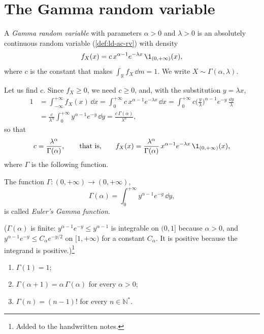 
\section{The Gamma random variable}\label{sec:tr-gamma}

\begin{definition}\label{def:tr-gamma}
A \emph{Gamma random variable} with parameters $\alpha>0$ and $\lambda>0$ is an absolutely
continuous random variable (\cref{def:ld-ac-rv}) with density
\[
  f_X(x)=c\,x^{\alpha-1}e^{-\lambda x}\,\1_{(0,+\infty)}(x),
\]
where $c$ is the constant that makes $\int_{\mathbb R}f_X\,\dd m=1$. We write $X\sim\Gamma(\alpha,\lambda)$.
\end{definition}

Let us find $c$. Since $f_X\ge0$, we need $c\ge0$, and, with the substitution $y=\lambda x$,
\[
\begin{aligned}
  1&=\int_{-\infty}^{+\infty}f_X(x)\,\dd x=\int_0^{+\infty}c\,x^{\alpha-1}e^{-\lambda x}\,\dd x
  =\int_0^{+\infty}c\Big(\frac y\lambda\Big)^{\alpha-1}e^{-y}\,\frac{\dd y}\lambda\\
  &=\frac c{\lambda^\alpha}\int_0^{+\infty}y^{\alpha-1}e^{-y}\,\dd y=\frac{c\,\Gamma(\alpha)}{\lambda^\alpha},
\end{aligned}
\]
so that
\[
  c=\frac{\lambda^\alpha}{\Gamma(\alpha)},\qquad\text{that is,}\qquad
  f_X(x)=\frac{\lambda^\alpha}{\Gamma(\alpha)}\,x^{\alpha-1}e^{-\lambda x}\,\1_{(0,+\infty)}(x),
\]
where $\Gamma$ is the following function.

\begin{definition}\label{def:tr-gamma-function}
The function $\Gamma:(0,+\infty)\to(0,+\infty)$,
\[
  \Gamma(\alpha)=\int_0^{+\infty}y^{\alpha-1}e^{-y}\,\dd y ,
\]
is called \emph{Euler's Gamma function}.
\end{definition}

($\Gamma(\alpha)$ is finite: $y^{\alpha-1}e^{-y}\le y^{\alpha-1}$ is integrable on $(0,1]$ because
$\alpha>0$, and $y^{\alpha-1}e^{-y}\le C_\alpha e^{-y/2}$ on $[1,+\infty)$ for a constant
$C_\alpha$. It is positive because the integrand is positive.)\footnote{Added to the
handwritten notes.}

\begin{proposition}\label{prop:tr-gamma-function}
\begin{enumerate}[label=\arabic*)]
  \item $\Gamma(1)=1$;
  \item $\Gamma(\alpha+1)=\alpha\,\Gamma(\alpha)$ for every $\alpha>0$;
  \item $\Gamma(n)=(n-1)!$ for every $n\in\mathbb N^*$.
\end{enumerate}
\end{proposition}

